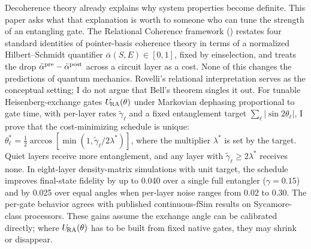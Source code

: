 
Decoherence theory already explains why system properties become
definite. This paper asks what that explanation is worth to someone who
can tune the strength of an entangling gate. The Relational Coherence
framework (\RCF) restates four standard identities of pointer-basis
coherence theory in terms of a normalized Hilbert--Schmidt quantifier
$\bar\alpha(S,E)\in[0,1]$, fixed by einselection, and treats the drop
$\bar\alpha^{\rm pre}-\bar\alpha^{\rm post}$ across a circuit layer as a
cost. None of this changes the predictions of quantum mechanics.
Rovelli's relational interpretation serves as the conceptual setting;
I do not argue that Bell's theorem singles it out.
For tunable Heisenberg-exchange gates $U_{\!\mathrm{RA}}(\theta)$ under Markovian
dephasing proportional to gate time, with per-layer rates
$\tilde\gamma_\ell$ and a fixed entanglement target
$\sum_\ell|\sin 2\theta_\ell|$, I prove that the cost-minimizing
schedule is unique:
$\theta_\ell^{*}=\tfrac12\arccos[\min(1,\tilde\gamma_\ell/2\lambda^{*})]$,
where the multiplier $\lambda^{*}$ is set by the target. Quiet layers
receive more entanglement, and any layer with
$\tilde\gamma_\ell\ge 2\lambda^{*}$ receives none. In eight-layer
density-matrix simulations with unit target, the schedule improves
final-state fidelity by up to 0.040 over a single full entangler
($\gamma=0.15$) and by 0.025 over equal angles when per-layer noise
ranges from 0.02 to 0.30. The per-gate behavior agrees with published
continuous-fSim results on Sycamore-class processors. These gains
assume the exchange angle can be calibrated directly; where
$U_{\!\mathrm{RA}}(\theta)$ has to be built from fixed native gates, they may shrink
or disappear.